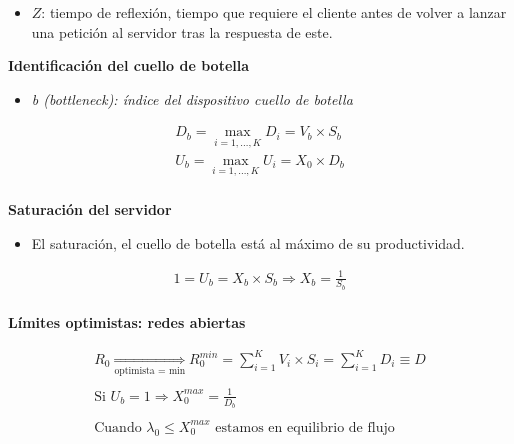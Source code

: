 \documentclass[a4paper,12pt]{article}
\begin{document}
\begin{itemize}
    \item $Z$: tiempo de reflexión, tiempo que requiere el cliente antes de volver a lanzar una petición al servidor tras la respuesta de este.
\end{itemize}

\textbf{Identificación del cuello de botella}

\begin{itemize}
    \item \textit{b (bottleneck): índice del dispositivo cuello de botella}
\end{itemize}

\begin{tcolorbox}[colback=yellow!5!white, colframe=yellow!75!black]
    \begin{align*}
        D_b = \max_{i=1, \ldots, K} D_i = V_b \times S_b \\ 
        U_b = \max_{i=1, \ldots, K} U_i = X_0 \times D_b \\
    \end{align*}
\end{tcolorbox}

\textbf{Saturación del servidor}

\begin{itemize}
    \item El saturación, el cuello de botella está al máximo de su productividad.
\end{itemize}

\begin{tcolorbox}[colback=yellow!5!white, colframe=yellow!75!black]
    \begin{align*}
        1 = U_b = X_b \times S_b \Rightarrow X_b = \frac{1}{S_b} \\
    \end{align*}
\end{tcolorbox}

\textbf{Límites optimistas: redes abiertas}

\begin{tcolorbox}[colback=yellow!5!white, colframe=yellow!75!black]
    \begin{align*}
        R_0 \underset{\text{optimista = min}}{\Rightarrow} R_0^{min} = \sum_{i=1}^{K} V_i \times S_i = \sum_{i=1}^{K} D_i \equiv D \\ \\
        \text{Si } U_b = 1 \Rightarrow X_0^{max} = \frac{1}{D_b} \\ \\
        \text{Cuando } \lambda_0 \leq X_0^{max} \text{ estamos en equilibrio de flujo }\\
    \end{align*}
\end{tcolorbox}
\end{document}
